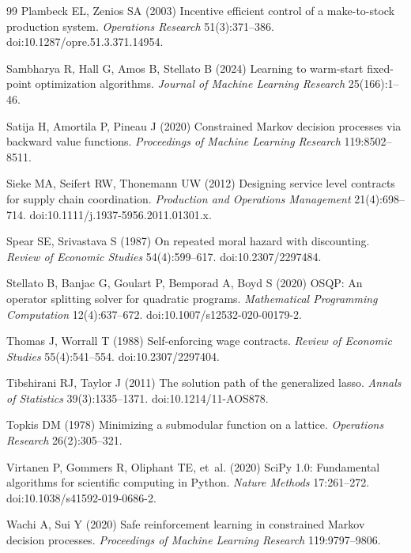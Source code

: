\documentclass[11pt,letterpaper]{article}
\theoremstyle{definition}
\newcommand{\1}{\mathbf 1}
\begin{document}
\begin{thebibliography}{99}
Plambeck EL, Zenios SA (2003) Incentive efficient control of a make-to-stock production system. \emph{Operations Research} 51(3):371--386. doi:10.1287/opre.51.3.371.14954.

Sambharya R, Hall G, Amos B, Stellato B (2024) Learning to warm-start fixed-point optimization algorithms. \emph{Journal of Machine Learning Research} 25(166):1--46.

Satija H, Amortila P, Pineau J (2020) Constrained Markov decision processes via backward value functions. \emph{Proceedings of Machine Learning Research} 119:8502--8511.

Sieke MA, Seifert RW, Thonemann UW (2012) Designing service level contracts for supply chain coordination. \emph{Production and Operations Management} 21(4):698--714. doi:10.1111/j.1937-5956.2011.01301.x.

Spear SE, Srivastava S (1987) On repeated moral hazard with discounting. \emph{Review of Economic Studies} 54(4):599--617. doi:10.2307/2297484.

Stellato B, Banjac G, Goulart P, Bemporad A, Boyd S (2020) OSQP: An operator splitting solver for quadratic programs. \emph{Mathematical Programming Computation} 12(4):637--672. doi:10.1007/s12532-020-00179-2.

Thomas J, Worrall T (1988) Self-enforcing wage contracts. \emph{Review of Economic Studies} 55(4):541--554. doi:10.2307/2297404.

Tibshirani RJ, Taylor J (2011) The solution path of the generalized lasso. \emph{Annals of Statistics} 39(3):1335--1371. doi:10.1214/11-AOS878.

Topkis DM (1978) Minimizing a submodular function on a lattice. \emph{Operations Research} 26(2):305--321.



Virtanen P, Gommers R, Oliphant TE, et~al. (2020) SciPy 1.0: Fundamental algorithms for scientific computing in Python. \emph{Nature Methods} 17:261--272. doi:10.1038/s41592-019-0686-2.

Wachi A, Sui Y (2020) Safe reinforcement learning in constrained Markov decision processes. \emph{Proceedings of Machine Learning Research} 119:9797--9806.


\end{thebibliography}

\end{document}
